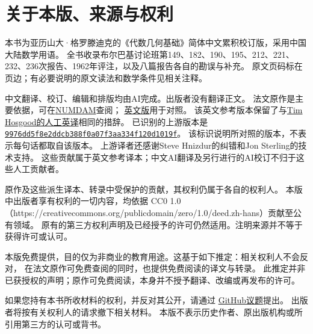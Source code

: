 \chapter*{关于本版、来源与权利}
本书为亚历山大·格罗滕迪克的《代数几何基础》简体中文累积校订版，采用中国大陆数学用语。
全书收录布尔巴基讨论班第149、182、190、195、212、221、232、236次报告、1962年评注，以及八篇报告各自的勘误与补充。
原文页码标在页边；有必要说明的原文读法和数学条件见相关注释。

中文翻译、校订、编辑和排版均由AI完成。出版者没有翻译正文。
法文原作是主要依据，可在\href{https://www.numdam.org/}{NUMDAM}查阅；
\href{https://github.com/KokunoYumeto/fga-en}{英文版}用于对照。
该英文参考版本保留了与\href{https://github.com/thosgood/fga}{Tim Hosgood的人工英译}相同的措辞。
已识别的上游版本是
\href{https://github.com/thosgood/fga/tree/9976dd5f8e2ddcb388f0a07f3aa334f120d1019f}{\nolinkurl{9976dd5f8e2ddcb388f0a07f3aa334f120d1019f}}。
该标识说明所对照的版本，不表示每句话都取自该版本。
上游译者还感谢Steve Hnizdur的纠错和Jon Sterling的技术支持。
这些贡献属于英文参考译本；中文AI翻译及另行进行的AI校订不归于这些人工贡献者。

原作及这些派生译本、转录中受保护的贡献，其权利仍属于各自的权利人。
本版中出版者享有权利的一切内容，均依据 CC0 1.0（https://creativecommons.org/publicdomain/zero/1.0/deed.zh-hans）贡献至公有领域。
原有的第三方权利声明及已经授予的许可仍然适用。注明来源并不等于获得许可或认可。

本版免费提供，目的仅为非商业的教育用途。这基于如下推定：相关权利人不会反对，
在法文原作可免费查阅的同时，也提供免费阅读的译文与转录。
此推定并非已获授权的声明；原作可免费阅读，本身并不授予翻译、改编或再发布的许可。

如果您持有本书所收材料的权利，并反对其公开，请通过
\href{https://github.com/KokunoYumeto/fga-zh-hans-cn/issues}{GitHub议题}提出。
出版者将按有关权利人的请求撤下相关材料。
本版不表示历史作者、原出版机构或所引用第三方的认可或背书。
\clearpage

